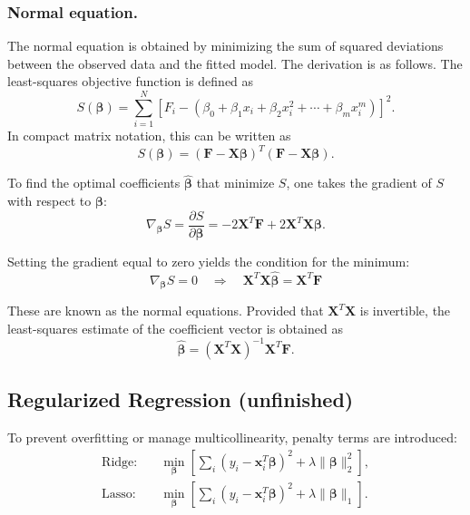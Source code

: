 \documentclass[../../../main.tex]{subfiles}
\begin{document}
\subsubsection{Normal equation.}
The normal equation is obtained by minimizing the sum of squared deviations between the observed data and the fitted model.
The derivation is as follows.
The least-squares objective function is defined as
\begin{equation}
    S(\boldsymbol{\beta}) = \sum_{i=1}^{N}
    \left[ F_i - \left( \beta_0 + \beta_1 x_i + \beta_2 x_i^2 + \cdots + \beta_m x_i^m \right) \right]^2.
\end{equation}
In compact matrix notation, this can be written as
\begin{equation}
    S(\boldsymbol{\beta}) = (\mathbf{F} - \mathbf{X}\boldsymbol{\beta})^{T}(\mathbf{F} - \mathbf{X}\boldsymbol{\beta}).
\end{equation}

To find the optimal coefficients \(\hat{\boldsymbol{\beta}}\) that minimize \(S\), one takes the gradient of \(S\) with respect to \(\boldsymbol{\beta}\):
\begin{equation}
    \nabla_{\boldsymbol{\beta}} S =
    \frac{\partial S}{\partial \boldsymbol{\beta}}
    = -2\mathbf{X}^{T}\mathbf{F} + 2\mathbf{X}^{T}\mathbf{X}\boldsymbol{\beta}.
\end{equation}

Setting the gradient equal to zero yields the condition for the minimum:
\begin{equation}
    \nabla_{\boldsymbol{\beta}} S = 0
    \quad \Longrightarrow \quad
    \mathbf{X}^{T}\mathbf{X}\hat{\boldsymbol{\beta}} = \mathbf{X}^{T}\mathbf{F}
\end{equation}

These are known as the normal equations.
Provided that \(\mathbf{X}^{T}\mathbf{X}\) is invertible, the least-squares estimate of the coefficient vector is obtained as
\begin{equation}
    \hat{\boldsymbol{\beta}} = (\mathbf{X}^{T}\mathbf{X})^{-1}\mathbf{X}^{T}\mathbf{F}.
\end{equation}

\subsection{Regularized Regression (unfinished)}
To prevent overfitting or manage multicollinearity, penalty terms are introduced:
\begin{align*}
    \text{Ridge:} & \quad \min_{\boldsymbol{\beta}} \left[ \sum_i (y_i - \mathbf{x}_i^T \boldsymbol{\beta})^2 + \lambda \|\boldsymbol{\beta}\|_2^2 \right], \\
    \text{Lasso:} & \quad \min_{\boldsymbol{\beta}} \left[ \sum_i (y_i - \mathbf{x}_i^T \boldsymbol{\beta})^2 + \lambda \|\boldsymbol{\beta}\|_1 \right].
\end{align*}
\end{document}
